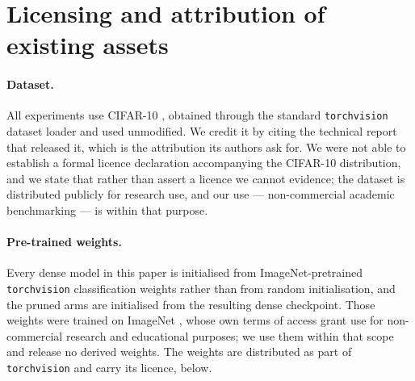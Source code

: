 %
%
%

\section{Licensing and attribution of existing assets}
\label{sec:stmt:licensing}

\paragraph{Dataset.}
All experiments use CIFAR-10 \citep{krizhevsky2009cifar}, obtained through the
standard \texttt{torchvision} dataset loader and used unmodified. We credit it
by citing the technical report that released it, which is the attribution its
authors ask for. We were not able to establish a formal licence declaration
accompanying the CIFAR-10 distribution, and we state that rather than assert a
licence we cannot evidence; the dataset is distributed publicly for research
use, and our use --- non-commercial academic benchmarking --- is within that
purpose.

\paragraph{Pre-trained weights.}
Every dense model in this paper is initialised from ImageNet-pretrained
\texttt{torchvision} classification weights rather than from random
initialisation, and the pruned arms are initialised from the resulting dense
checkpoint. Those weights were trained on ImageNet
\citep{deng2009imagenet}, whose own terms of access grant use for
non-commercial research and educational purposes; we use them within that
scope and release no derived weights. The weights are distributed as part of
\texttt{torchvision} and carry its licence, below.

